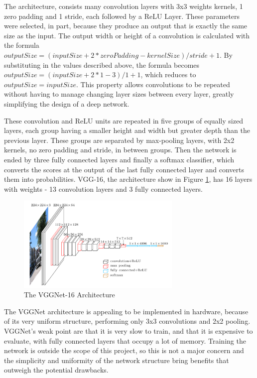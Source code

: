 \documentclass[12pt]{article}
\begin{document}
The architecture, consists many convolution layers with 3x3 weights kernels, 1 zero padding and 1 stride, each followed by a ReLU Layer. These parameters were selected, in part, because they produce an output that is exactly the same size as the input. The output width or height of a convolution is calculated with the formula $outputSize = (inputSize + 2 * zeroPadding - kernelSize)/stride + 1$. By substituting in the values described above, the formula becomes $outputSize = (inputSize + 2 * 1 - 3)/1 + 1$, which reduces to $outputSize = inputSize$. This property allows convolutions to be repeated without having to manage changing layer sizes between every layer, greatly simplifying the design of a deep network.

These convolution and ReLU units are repeated in five groups of equally sized layers, each group having a smaller height and width but greater depth than the previous layer. These groups are separated by max-pooling layers, with 2x2 kernels, no zero padding and stride, in between groups. Then the network is ended by three fully connected layers and finally a softmax classifier, which converts the scores at the output of the last fully connected layer and converts them into probabilities. VGG-16, the architecture show in Figure \ref{fig:vgg}, has 16 layers with weights - 13 convolution layers and 3 fully connected layers.


\begin{figure} [H]
\centering
\includegraphics[width=0.7\textwidth]{figures/vgg16.png}
\caption{The VGGNet-16 Architecture\cite{vgg16}}
\label{fig:vgg}
\end{figure}

The VGGNet architecture is appealing to be implemented in hardware, because of its very uniform structure, performing only 3x3 convolutions and 2x2 pooling. VGGNet's weak point are that it is very slow to train, and that it is expensive to evaluate, with fully connected layers that occupy a lot of memory. Training the network is outside the scope of this project, so this is not a major concern and the simplicity and uniformity of the network structure bring benefits that outweigh the potential drawbacks.
\end{document}
